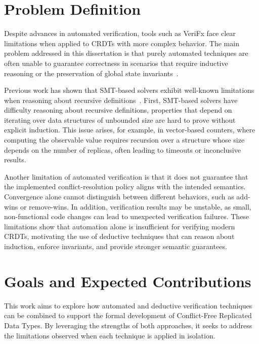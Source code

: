 \section{Problem Definition}
\label{sec:problem}


Despite advances in automated verification, tools such as VeriFx face clear limitations when applied to CRDTs with more complex behavior. The main problem addressed in this dissertation is that purely automated techniques are often unable to guarantee correctness in scenarios that require inductive reasoning or the preservation of global state invariants~\cite{dina2022thesis}.

Previous work has shown that SMT-based solvers exhibit well-known limitations when reasoning about recursive definitions~\cite{why3}. First, SMT-based solvers have difficulty reasoning about recursive definitions, properties that depend on iterating over data structures of unbounded size are hard to prove without explicit induction. This issue arises, for example, in vector-based counters, where computing the observable value requires recursion over a structure whose size depends on the number of replicas, often leading to timeouts or inconclusive results.

Another limitation of automated verification is that it does not guarantee that the implemented conflict-resolution policy aligns with the intended semantics. Convergence alone cannot distinguish between different behaviors, such as add-wins or remove-wins. In addition, verification results may be unstable, as small, non-functional code changes can lead to unexpected verification failures. These limitations show that automation alone is insufficient for verifying modern CRDTs, motivating the use of deductive techniques that can reason about induction, enforce invariants, and provide stronger semantic guarantees.

\section{Goals and Expected Contributions}
\label{sec:contributions}


This work aims to explore how automated and deductive verification techniques can be combined to support the formal development of Conflict-Free Replicated Data Types. By leveraging the strengths of both approaches, it seeks to address the limitations observed when each technique is applied in isolation.

